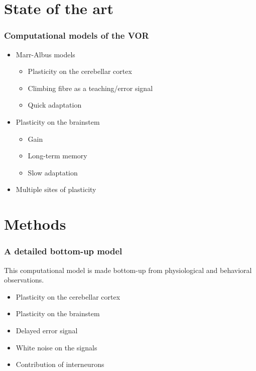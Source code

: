 \documentclass[10pt, compress]{beamer}
\begin{document}
\section{State of the art}


\begin{frame}[fragile]
  \frametitle{Computational models of the VOR}
  \begin{itemize}
    \item Marr-Albus models
    \begin{itemize}
      \item Plasticity on the cerebellar cortex
      \item Climbing fibre as a teaching/error signal
      \item Quick adaptation
    \end{itemize}
    \item Plasticity on the brainstem
    \begin{itemize}
      \item Gain
      \item Long-term memory
      \item Slow adaptation
    \end{itemize}
    \item Multiple sites of plasticity
  \end{itemize}
\end{frame}


\section{Methods}


\begin{frame}[fragile]
  \frametitle{A detailed bottom-up model}
  This computational model is made bottom-up from physiological and behavioral observations.
  \begin{itemize}
    \item Plasticity on the cerebellar cortex
    \item Plasticity on the brainstem
    \item Delayed error signal
    \item White noise on the signals
    \item Contribution of interneurons
  \end{itemize}
  \cite{Clopath2014}
\end{frame}
\end{document}

